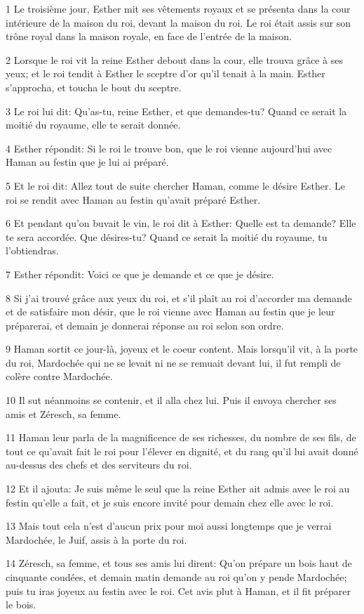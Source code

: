 \par 1 Le troisième jour, Esther mit ses vêtements royaux et se présenta dans la cour intérieure de la maison du roi, devant la maison du roi. Le roi était assis sur son trône royal dans la maison royale, en face de l'entrée de la maison.
\par 2 Lorsque le roi vit la reine Esther debout dans la cour, elle trouva grâce à ses yeux; et le roi tendit à Esther le sceptre d'or qu'il tenait à la main. Esther s'approcha, et toucha le bout du sceptre.
\par 3 Le roi lui dit: Qu'as-tu, reine Esther, et que demandes-tu? Quand ce serait la moitié du royaume, elle te serait donnée.
\par 4 Esther répondit: Si le roi le trouve bon, que le roi vienne aujourd'hui avec Haman au festin que je lui ai préparé.
\par 5 Et le roi dit: Allez tout de suite chercher Haman, comme le désire Esther. Le roi se rendit avec Haman au festin qu'avait préparé Esther.
\par 6 Et pendant qu'on buvait le vin, le roi dit à Esther: Quelle est ta demande? Elle te sera accordée. Que désires-tu? Quand ce serait la moitié du royaume, tu l'obtiendras.
\par 7 Esther répondit: Voici ce que je demande et ce que je désire.
\par 8 Si j'ai trouvé grâce aux yeux du roi, et s'il plaît au roi d'accorder ma demande et de satisfaire mon désir, que le roi vienne avec Haman au festin que je leur préparerai, et demain je donnerai réponse au roi selon son ordre.
\par 9 Haman sortit ce jour-là, joyeux et le coeur content. Mais lorsqu'il vit, à la porte du roi, Mardochée qui ne se levait ni ne se remuait devant lui, il fut rempli de colère contre Mardochée.
\par 10 Il sut néanmoins se contenir, et il alla chez lui. Puis il envoya chercher ses amis et Zéresch, sa femme.
\par 11 Haman leur parla de la magnificence de ses richesses, du nombre de ses fils, de tout ce qu'avait fait le roi pour l'élever en dignité, et du rang qu'il lui avait donné au-dessus des chefs et des serviteurs du roi.
\par 12 Et il ajouta: Je suis même le seul que la reine Esther ait admis avec le roi au festin qu'elle a fait, et je suis encore invité pour demain chez elle avec le roi.
\par 13 Mais tout cela n'est d'aucun prix pour moi aussi longtemps que je verrai Mardochée, le Juif, assis à la porte du roi.
\par 14 Zéresch, sa femme, et tous ses amis lui dirent: Qu'on prépare un bois haut de cinquante coudées, et demain matin demande au roi qu'on y pende Mardochée; puis tu iras joyeux au festin avec le roi. Cet avis plut à Haman, et il fit préparer le bois.

